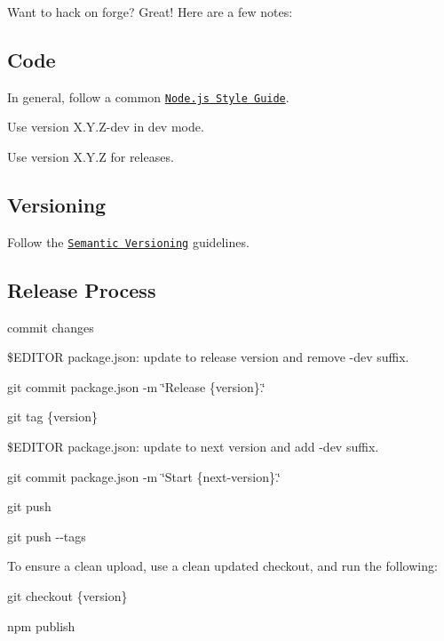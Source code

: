 Want to hack on forge? Great! Here are a few notes\+:

\subsection*{Code }


\begin{DoxyItemize}
\item In general, follow a common \href{http://nodeguide.com/style.html}{\tt Node.\+js Style Guide}.
\item Use version X.\+Y.\+Z-\/dev in dev mode.
\item Use version X.\+Y.\+Z for releases.
\end{DoxyItemize}

\subsection*{Versioning }


\begin{DoxyItemize}
\item Follow the \href{http://semver.org/}{\tt Semantic Versioning} guidelines.
\end{DoxyItemize}

\subsection*{Release Process }


\begin{DoxyItemize}
\item commit changes
\item {\ttfamily \$\+E\+D\+I\+T\+OR package.\+json}\+: update to release version and remove {\ttfamily -\/dev} suffix.
\item {\ttfamily git commit package.\+json -\/m \char`\"{}\+Release \{version\}.\char`\"{}}
\item {\ttfamily git tag \{version\}}
\item {\ttfamily \$\+E\+D\+I\+T\+OR package.\+json}\+: update to next version and add {\ttfamily -\/dev} suffix.
\item {\ttfamily git commit package.\+json -\/m \char`\"{}\+Start \{next-\/version\}.\char`\"{}}
\item {\ttfamily git push}
\item {\ttfamily git push -\/-\/tags}
\end{DoxyItemize}

To ensure a clean upload, use a clean updated checkout, and run the following\+:


\begin{DoxyItemize}
\item {\ttfamily git checkout \{version\}}
\item {\ttfamily npm publish} 
\end{DoxyItemize}